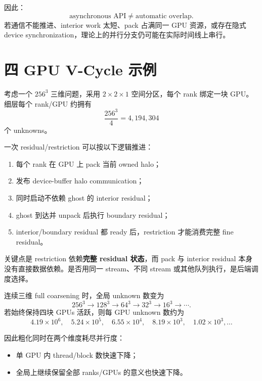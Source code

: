 因此：
\begin{equation}
\boxed{
\text{asynchronous API}
\neq
\text{automatic overlap}.
}
\end{equation}
若通信不能推进、interior work 太短、pack 占满同一 GPU 资源，或存在隐式 device synchronization，理论上的并行分支仍可能在实际时间线上串行。

\section{四 GPU V-Cycle 示例}
\label{sec:distributed-gpu-trace}

考虑一个 $256^3$ 三维问题，采用 $2\times2\times1$ 空间分区，每个 rank 绑定一块 GPU。细层每个 rank/GPU 约拥有
\begin{equation}
\frac{256^3}{4}
=
4{,}194{,}304
\end{equation}
个 unknowns。

一次 residual/restriction 可以按以下逻辑推进：

\begin{enumerate}
\item 每个 rank 在 GPU 上 pack 当前 owned halo；
\item 发布 device-buffer halo communication；
\item 同时启动不依赖 ghost 的 interior residual；
\item ghost 到达并 unpack 后执行 boundary residual；
\item interior/boundary residual 都 ready 后，restriction 才能消费完整 fine residual。
\end{enumerate}

关键点是 restriction 依赖\textbf{完整 residual 状态}，而 pack 与 interior residual 本身没有直接数据依赖。是否用同一 stream、不同 stream 或其他队列执行，是后端调度选择。

连续三维 full coarsening 时，全局 unknown 数变为
\begin{equation}
256^3
\rightarrow
128^3
\rightarrow
64^3
\rightarrow
32^3
\rightarrow
16^3
\rightarrow\cdots.
\end{equation}
若始终保持四块 GPUs 活跃，则每 GPU unknown 数约为
\begin{equation}
4.19\times10^6,
\quad
5.24\times10^5,
\quad
6.55\times10^4,
\quad
8.19\times10^3,
\quad
1.02\times10^3,\ldots
\end{equation}

因此粗化同时在两个维度耗尽并行度：
\begin{itemize}
\item 单 GPU 内 thread/block 数快速下降；
\item 全局上继续保留全部 ranks/GPUs 的意义也快速下降。
\end{itemize}


